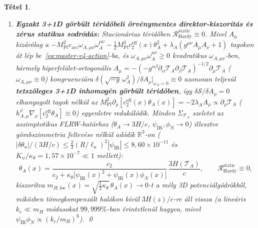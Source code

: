 \documentclass[11pt,a4paper]{article}
\newtheorem{theorem}{Tétel}
\begin{document}
\begin{theorem}
\begin{enumerate}
  \item \textbf{Egzakt 3+1D görbült téridőbeli örvénymentes direktor-kiszorítás és zérus statikus sodródás:} Stacionárius téridőben $\mathcal{R}_{\mathrm{Hardy}}^{\mathrm{static}} \equiv 0$. Mivel $A_\mu$ \emph{kizárólag} a $-M_{\mathrm{Pl}}^2 c_{\mathrm{acc}}\omega_{A,\mu\nu}\omega_A^{\mu\nu} - \frac{1}{2}M_{\mathrm{Pl}}^2 c_2^{\mathrm{eff}}(x)\theta_A^2 + \lambda_A(g^{\mu\nu}A_\mu A_\nu + 1)$ tagokon át lép be~\eqref{eq:master-v4-action}-ba, és $\omega_{A,\mu\nu}\omega_A^{\mu\nu} \ge 0$ kvadratikus $\omega_{A,\mu\nu}$-ben, bármely hiperfelület-ortogonális $A_\mu = -(-g^{\alpha\beta}\partial_\alpha\mathcal{T}_A\partial_\beta\mathcal{T}_A)^{-1/2}\partial_\mu\mathcal{T}_A$ ($\omega_{A,\mu\nu} \equiv 0$) kongruenciára $\delta(\sqrt{-g}\,\omega_A^2)/\delta A_\rho\big|_{\omega_A=0} \equiv 0$ azonosan teljesül \textbf{tetszőleges 3+1D inhomogén görbült téridőben}, így $\delta\mathcal{S}/\delta A_\rho = 0$ \emph{elhanyagolt tagok nélkül} az $M_{\mathrm{Pl}}^2\partial_\rho[c_2^{\mathrm{eff}}(x)\theta_A(x)] = -2\lambda_A A_\rho \propto \partial_\rho\mathcal{T}_A$ ($h_{A,\mu}^\rho\nabla_\rho[c_2^{\mathrm{eff}}\theta_A] \equiv 0$) egyenletre redukálódik. Minden $\Sigma_{\mathcal{T}_A}$ szeletet az aszimptotikus FLRW-határhoz ($\theta_A \to 3H/c$, $\psi_{\mathrm{IR}},\phi_N \to 0$) illesztve gömbszimmetria feltevése nélkül adódik $\mathbb{R}^3$-on ($|\delta\theta_u|/(3H/c) \le \frac{2}{3}(R/\ell_u)^2|\psi_{\mathrm{IR}}| \le 8{,}60\times 10^{-11}$ és $K_\psi/\kappa_\theta = 1{,}57\times 10^{-7} \ll 1$ mellett):
  \begin{equation}
    \theta_A(x) = \frac{c_2}{c_2 + \kappa_\theta\bigl[\psi_{\mathrm{IR}}(x)^2 + \psi_{\mathrm{IR}}(x)\phi_N(x)\bigr]}\,\frac{3H(\mathcal{T}_A)}{c}, \qquad \mathcal{R}_{\mathrm{Hardy}}^{\mathrm{static}} \equiv 0,
    \label{eq:hardy-bound}
  \end{equation}
  kiszorítva $m_{H,\mathrm{loc}}(x) = \sqrt{\frac{1}{2}\kappa_\theta}\,\theta_A(x) \to 0$-t a mély 3D potenciálgödrökből, miközben tömegkompenzált halókon kívül $3H(z)/c$-re áll vissza (a lineáris $k_c \ll m_H$ módusokat $99{,}999\%$-ban érintetlenül hagyva, mivel $\psi_{\mathrm{IR}}\phi_N \propto (k_c/m_H)^6$). \qed
\end{enumerate}
\end{theorem}
\end{document}
